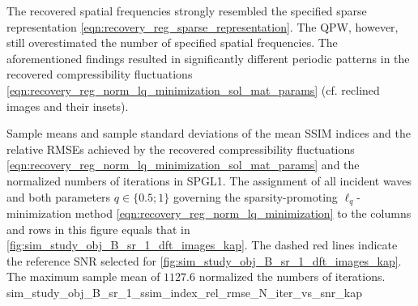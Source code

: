 The recovered spatial frequencies strongly resembled
the specified sparse representation
\eqref{eqn:recovery_reg_sparse_representation}.
The \ac{QPW}, however, still overestimated
the number of
specified spatial frequencies.
The aforementioned findings resulted in
significantly different periodic patterns in
the recovered compressibility fluctuations
\eqref{eqn:recovery_reg_norm_lq_minimization_sol_mat_params}
(cf. reclined images and their insets).


%
{%
 Sample means and
 sample standard deviations of
 the mean \acf{SSIM} indices and
 the relative \acfp{RMSE} achieved by
 the recovered compressibility fluctuations
 \eqref{eqn:recovery_reg_norm_lq_minimization_sol_mat_params} and
 the normalized numbers of
 iterations in
 \ac{SPGL1}. 
 The assignment of
 all incident waves and
 both parameters
 $q \in \{ 0.5; 1 \}$ governing
 the sparsity-promoting $\ell_{q}$-minimization method
 \eqref{eqn:recovery_reg_norm_lq_minimization} to
 the columns and rows in
 this figure equals
 that in
 \cref{fig:sim_study_obj_B_sr_1_dft_images_kap}.
 The dashed red lines indicate
 the reference \ac{SNR} selected for
 \cref{fig:sim_study_obj_B_sr_1_dft_images_kap}.
 The maximum sample mean of
 $\num{1127.6}$ normalized
 the numbers of
 iterations.
}%
{sim_study_obj_B_sr_1_ssim_index_rel_rmse_N_iter_vs_snr_kap}

